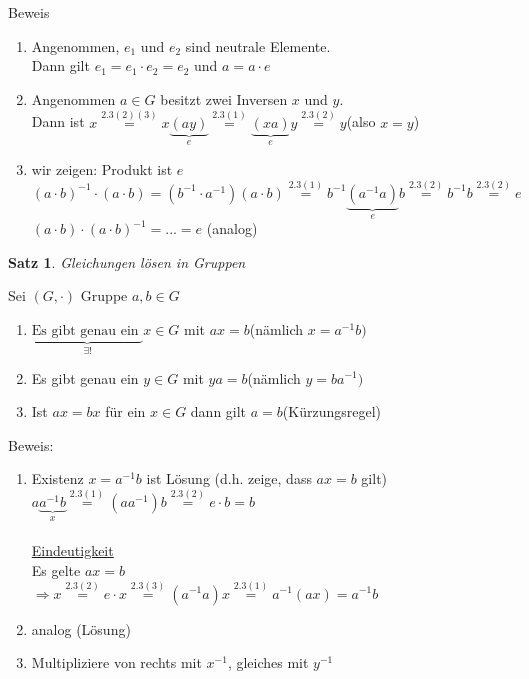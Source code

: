 \documentclass[a4paper,11pt]{article}
\newtheorem{satz}[definition]{Satz}
\begin{document}
Beweis
\begin{enumerate}[label=\alph*)]
\item Angenommen, $e_1$ und $e_2$ sind neutrale Elemente.\\
Dann gilt $e_1=e_1\cdot e_2=e_2$ und $a=a\cdot e$
\item Angenommen $a\in G$ besitzt zwei Inversen $x$ und $y$.\\
Dann ist $x \overset{2.3(2)(3)}{=}x\underbrace{(ay)}_{e}\overset{2.3(1)}{=}\underbrace{(xa)}_{e}y\overset{2.3(2)}{=}y$\hspace{5mm}(also $x=y$)
\item wir zeigen: Produkt ist $e$ \\
$(a\cdot b)^{-1}\cdot(a\cdot b) = (b^{-1}\cdot a^{-1})(a\cdot b)\overset{2.3(1)}{=}b^{-1}\underbrace{(a^{-1}a)}_{e}b\overset{2.3(2)}{=}b^{-1}b\overset{2.3(2)}{=}e$ \\
$(a\cdot b)\cdot(a\cdot b)^{-1}=...=e$ (analog)
\end{enumerate}
\newpage
\begin{satz}
Gleichungen lösen in Gruppen
\end{satz}
Sei $(G,\cdot)$ Gruppe $a,b\in G$
\begin{enumerate}[label=\alph*)]
\item $\underbrace{\text{Es gibt genau ein }}_{\exists!} x\in G$ mit $ax=b$\hspace{5mm}(nämlich $x=a^{-1}b)$
\item Es gibt genau ein $y\in G$ mit $ya=b$\hspace{5mm}(nämlich $y=ba^{-1})$
\item Ist $ax = bx$ für ein $x\in G$ dann gilt $a=b$\hspace{5mm}(Kürzungsregel)
\end{enumerate}
Beweis:
\begin{enumerate}[label=\alph*)]
\item Existenz $x=a^{-1}b$ ist Lösung (d.h. zeige, dass $ax=b$ gilt) \\
$a\underbrace{a^{-1}b}_{x}\overset{2.3(1)}{=}(aa^{-1})b\overset{2.3(2)}{=}e\cdot b=b$ \\
\\
\underline{Eindeutigkeit} \\
Es gelte $ax=b$ \\
$\Rightarrow x\overset{2.3(2)}{=}e\cdot x\overset{2.3(3)}{=}(a^{-1}a)x\overset{2.3(1)}{=}a^{-1}(ax)=a^{-1}b$
\item analog (Lösung)
\item Multipliziere von rechts mit $x^{-1}$, gleiches mit $y^{-1}$
\end{enumerate}
\end{document}
